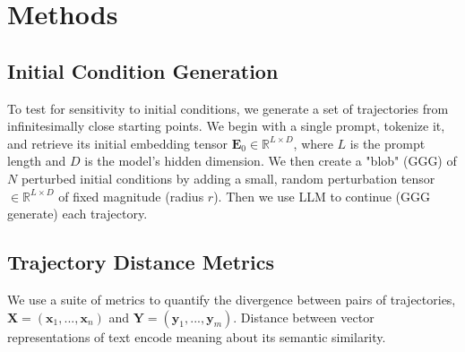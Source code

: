 \documentclass[a4paper,12pt]{article}
\begin{document}

\section{Methods}

\subsection{Initial Condition Generation}
To test for sensitivity to initial conditions, we generate a set of trajectories from infinitesimally close starting points. We begin with a single prompt, tokenize it, and retrieve its initial embedding tensor $\mathbf{E}_0 \in \mathbb{R}^{L \times D}$, where $L$ is the prompt length and $D$ is the model's hidden dimension. We then create a "blob" (GGG) of $N$ perturbed initial conditions by adding a small, random perturbation tensor $\in \mathbb{R}^{L \times D}$ of fixed magnitude (radius $r$). Then we use LLM to continue (GGG generate) each trajectory.

\subsection{Trajectory Distance Metrics}
We use a suite of metrics to quantify the divergence between pairs of trajectories, $\mathbf{X} = (\mathbf{x}_1, ..., \mathbf{x}_n)$ and $\mathbf{Y} = (\mathbf{y}_1, ..., \mathbf{y}_m)$. Distance between vector representations of text encode meaning about its semantic similarity.
\end{document}
